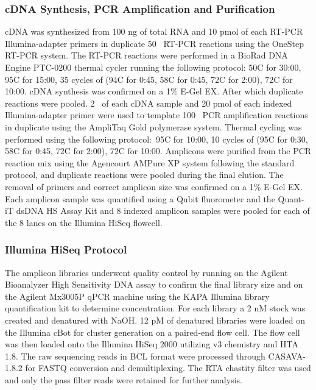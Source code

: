 \subsubsection{cDNA Synthesis, PCR Amplification and Purification}
cDNA was synthesized from 100 ng of total RNA and 10 pmol of each RT-PCR Illumina-adapter primers in duplicate 50 \microliter~RT-PCR reactions using the OneStep RT-PCR system. The RT-PCR reactions were performed in a BioRad DNA Engine PTC-0200 thermal cycler running the following protocol: 50\degree C for 30:00, 95\degree C for 15:00, 35 cycles of (94\degree C for 0:45, 58\degree C for 0:45, 72\degree C for 2:00), 72\degree C for 10:00. cDNA synthesis was confirmed on a 1\% E-Gel EX. After which duplicate reactions were pooled. 2 \microliter~of each cDNA sample and 20 pmol of each indexed Illumina-adapter primer were used to template 100 \microliter~PCR amplification reactions in duplicate using the AmpliTaq Gold polymerase system. Thermal cycling was performed using the following protocol: 95\degree C for 10:00, 10 cycles of (95\degree C for 0:30, 58\degree C for 0:45, 72\degree C for 2:00), 72\degree C for 10:00. Amplicons were purified from the PCR reaction mix using the Agencourt AMPure XP system following the standard protocol, and duplicate reactions were pooled during the final elution. The removal of primers and correct amplicon size was confirmed on a 1\% E-Gel EX. Each amplicon sample was quantified using a Qubit fluorometer and the Quant-iT\textsuperscript{\textregistered} dsDNA HS Assay Kit and 8 indexed amplicon samples were pooled for each of the 8 lanes on the Illumina HiSeq flowcell.

\subsubsection{Illumina HiSeq Protocol}
The amplicon libraries underwent quality control by running on the Agilent Bioanalyzer High Sensitivity DNA assay to confirm the final library size and on the Agilent Mx3005P qPCR machine using the KAPA Illumina library quantification kit to determine concentration. For each library a 2 nM stock was created and denatured with NaOH. 12 pM of denatured libraries were loaded on the Illumina cBot for cluster generation on a paired-end flow cell. The flow cell was then loaded onto the Illumina HiSeq 2000 utilizing v3 chemistry and HTA 1.8. The raw sequencing reads in BCL format were processed through CASAVA-1.8.2 for FASTQ conversion and demultiplexing. The RTA chastity filter was used and only the pass filter reads were retained for further analysis.

